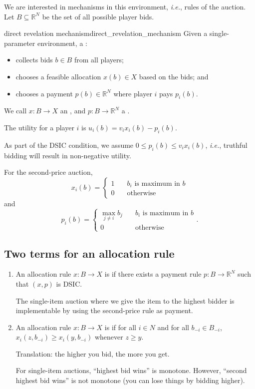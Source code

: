 \documentclass[12pt,letterpaper]{report}
\begin{document}
We are interested in mechanisms in this environment, \emph{i.e.}, rules of the auction.
Let $B \subseteq \mathbb{R}^N$ be the set of all possible player bids.

\begin{defn}{direct revelation mechanism}{direct_revelation_mechanism}
  Given a single-parameter environment, a :
  \begin{itemize}
    \item collects bids $b \in B$ from all players;
    \item chooses a feasible allocation $x(b) \in X$ based on the bids; and
    \item chooses a payment $p(b) \in \mathbb{R}^N$ where player $i$ pays $p_i(b)$.
  \end{itemize}
  We call $x \colon B \to X$ an , and $p \colon B \to \mathbb{R}^N$ a
  .

  The utility for a player $i$ is $u_i(b) = v_i x_i(b) - p_i(b)$.
\end{defn}

As part of the DSIC condition, we assume $0 \leq p_i(b) \leq v_i x_i(b)$, \emph{i.e.}, truthful
bidding will result in non-negative utility.

\begin{ex}
  For the second-price auction,
  \[
    x_i(b) = \begin{cases}
      1 \quad & b_i \text{ is maximum in } b \\
      0 & \text{otherwise}
    \end{cases}
  \]
  and
  \[
    p_i(b) = \begin{cases}
      \max\limits_{j \neq i} b_j \quad & b_i \text{ is maximum in } b \\
      0 & \text{otherwise}
    \end{cases}.
  \]
\end{ex}

\subsection{Two terms for an allocation rule}

\begin{enumerate}
  \item
  An allocation rule $x \colon B \to X$ is  if there exists a payment rule
  $p \colon B \to \mathbb{R}^N$ such that $(x, p)$ is DSIC.

  The single-item auction where we give the item to the highest bidder is implementable by using
  the second-price rule as payment.

  \item
  An allocation rule $x \colon B \to X$ is  if for all $i \in N$ and for all
  $b_{-i} \in B_{-i}$, $x_i(z, b_{-i}) \geq x_i(y, b_{-i})$ whenever $z \geq y$.

  Translation: the higher you bid, the more you get.

  For single-item auctions, ``highest bid wins'' is monotone.
  However, ``second highest bid wins'' is not monotone (you can lose things by bidding higher).
\end{enumerate}
\end{document}
